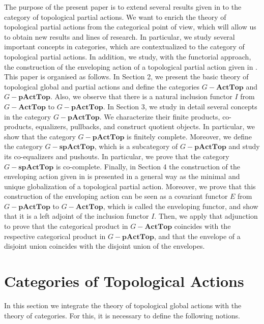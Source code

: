\documentclass[sn-mathphys-num]{sn-jnl}%
\theoremstyle{thmstyleone}%
\theoremstyle{thmstyletwo}%
\theoremstyle{thmstylethree}%
\begin{document}
The purpose of the present paper is to extend several results given in \cite{Avila1,Ovalle} to the category of topological partial actions.
We want to enrich the theory of topological partial actions from the categorical point of view, which will allow us to obtain new results and lines of research. In particular, we study several important concepts in categories, which are contextualized to the category of topological partial actions. In addition, we study, with the functorial approach, the construction of the enveloping action of a topological partial action given in \cite{Abadie2}.
This paper is organised as follows. In Section 2, we present the basic theory of topological global and partial actions and define the categories $G-\mathbf{ActTop}$ and $G-\mathbf{pActTop}$.
Also, we observe that there is a natural inclusion functor $I$ from $G-\mathbf{ActTop}$ to $G-\mathbf{pActTop}$. In Section 3, we study in detail several concepts in the category $G-\mathbf{pActTop}$.
We characterize their finite products, co-products, equalizers, pullbacks, and construct quotient objects. In particular, we show that the category  $G-\mathbf{pActTop}$ is finitely complete. Moreover, we define the category $G-\mathbf{spActTop}$, which is a subcategory of $G-\mathbf{pActTop}$ and study its co-equalizers and pushouts. In particular, we prove that the category $G-\mathbf{spActTop}$ is co-complete. Finally, in Section 4 the construction of the enveloping action given in \cite{Abadie2} is presented in a general way as the minimal and unique globalization of a topological partial action. Moreover, we prove that this construction of the enveloping action can be seen as a covariant functor $E$ from $G-\mathbf{pActTop}$ to $G-\mathbf{ActTop}$, which is called the enveloping functor, and show that it is a left adjoint of the inclusion functor $I$. Then, we apply that adjunction to prove that the categorical product in $G-\mathbf{ActTop}$ coincides with the respective categorical product in $G-\mathbf{pActTop}$, and that the envelope of a disjoint union coincides with the disjoint union of the envelopes.


\section{Categories of Topological Actions}

In this section we integrate the theory of topological global actions with the theory of categories. For this, it is necessary to define the following notions.\\
\end{document}
